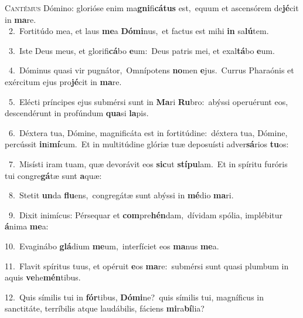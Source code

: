 \lettrine{\initial\textcolor{\initialcolor}{C}}{antémus} Dómino: glorióse enim ma\-\textbf{gni}\-fi\-\textbf{cá}\-\textbf{tus} est,~\star equum et ascensórem de\-\textbf{jé}\-cit in \textbf{ma}\-re.\\
{\numbfont\textcolor{\numbcolor}{~2.}}~Fortitúdo mea, et laus \textbf{me}\-a \textbf{Dó}\-\textbf{mi}nus,~\star et factus est mihi \textbf{in} sa\-\textbf{lú}\-tem.\par
{\numbfont\textcolor{\numbcolor}{~3.}}~Iste Deus meus, et glorifi\-\textbf{cá}\-bo \textbf{e}\-um:~\star Deus patris mei, et exal\-\textbf{tá}\-bo \textbf{e}\-um.\par
{\numbfont\textcolor{\numbcolor}{~4.}}~Dóminus quasi vir pugnátor,~\dagger Omnípotens \textbf{no}\-men \textbf{e}\-jus.~\star Currus Pharaónis et exércitum ejus pro\-\textbf{jé}\-cit in \textbf{ma}\-re.\par
{\numbfont\textcolor{\numbcolor}{~5.}}~Elécti príncipes ejus submérsi sunt in \textbf{Ma}\-ri \textbf{Ru}\-bro:~\star abýssi operuérunt eos, descendérunt in profúndum \textbf{qua}\-si \textbf{la}\-pis.\par
{\numbfont\textcolor{\numbcolor}{~6.}}~Déxtera tua, Dómine, magnificáta est in fortitúdine:~\dagger déxtera tua, Dómine, percússit \textbf{in}\-i\-\textbf{mí}\-cum.~\star Et in multitúdine glóriæ tuæ deposuísti adver\-\textbf{sá}\-rios \textbf{tu}\-os:\par
{\numbfont\textcolor{\numbcolor}{~7.}}~Misísti iram tuam, quæ devorávit eos \textbf{sic}\-ut \textbf{stí}\-\textbf{pu}lam.~\star Et in spíritu furóris tui congre\-\textbf{gá}\-tæ sunt \textbf{a}\-quæ:\par
{\numbfont\textcolor{\numbcolor}{~8.}}~Stetit \textbf{un}\-da \textbf{flu}\-ens,~\star congregátæ sunt abýssi in \textbf{mé}\-dio \textbf{ma}\-ri.\par
{\numbfont\textcolor{\numbcolor}{~9.}}~Dixit inimícus: Pérsequar et \textbf{com}\-pre\-\textbf{hén}\-dam,~\star dívidam spólia, implébitur \textbf{á}\-nima \textbf{me}\-a:\par
{\numbfont\textcolor{\numbcolor}{10.}}~Evaginábo \textbf{glá}\-dium \textbf{me}\-um,~\star interfíciet eos \textbf{ma}\-nus \textbf{me}\-a.\par
{\numbfont\textcolor{\numbcolor}{11.}}~Flavit spíritus tuus, et opéruit \textbf{e}\-os \textbf{ma}\-re:~\star submérsi sunt quasi plumbum in aquis \textbf{ve}\-he\-\textbf{mén}\-tibus.\par
{\numbfont\textcolor{\numbcolor}{12.}}~Quis símilis tui in \textbf{fór}\-tibus, \textbf{Dó}\-\textbf{mi}ne?~\star quis símilis tui, magníficus in sanctitáte, terríbilis atque laudábilis, fáciens \textbf{mi}\-ra\-\textbf{bí}\-lia?\par
